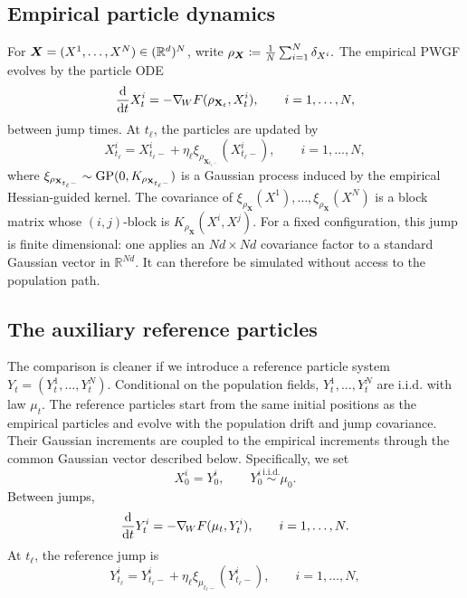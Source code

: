 \subsection{Empirical particle dynamics}
\label{subsec:particle-pwgf}

For \(\boldsymbol{X}=(X^1,\ldots,X^N)\in(\mathbb{R}^d)^N\), write $\rho_{\boldsymbol{X}}\coloneq \frac1N\sum_{i=1}^N \delta_{X^i}.$
The empirical PWGF evolves by the particle ODE
\begin{equation}
    \frac{\dd}{\dd t}X^i_t
    =
    -\nabla_{\!W} F(\rho_{\mathbf X_t},X^i_t),
    \qquad i=1,\ldots,N,
    \label{eq:particle-flow}
\end{equation}
between jump times.  At \(t_\ell\), the particles are updated by
\begin{equation}
    X^i_{t_\ell}
    =
    X^i_{t_\ell-}+\eta_\ell\xi_{\rho_{\mathbf X_{t_\ell-}}}(X^i_{t_\ell-}),
    \qquad i=1,\ldots,N,
    \label{eq:particle-jump}
\end{equation}
where \(\xi_{\rho_{\mathbf X_{t_\ell-}}} \sim \mathrm{GP}(0,K_{\rho_{\mathbf X_{t_\ell-}}})\) is a Gaussian process induced by the empirical Hessian-guided kernel.  The covariance of \(\xi_{\rho_{\mathbf X}}(X^1),\ldots,\xi_{\rho_{\mathbf X}}(X^N)\) is
a block matrix whose \((i,j)\)-block is \(K_{\rho_{\mathbf X}}(X^i,X^j)\).
For a fixed configuration, this jump is finite dimensional: one applies an
\(Nd\times Nd\) covariance factor to a standard Gaussian vector in
\(\mathbb R^{Nd}\). It can therefore be simulated without access to the
population path.

\subsection{The auxiliary reference particles}
\label{subsec:auxiliary-particles}

The comparison is cleaner if we introduce a reference particle system
\(Y_t=(Y^1_t,\ldots,Y^N_t)\). Conditional on the population fields,
\(Y_t^1,\ldots,Y_t^N\) are i.i.d. with law \(\mu_t\). The reference particles
start from the same initial positions as the empirical particles and evolve
with the population drift and jump covariance. Their Gaussian increments are
coupled to the empirical increments through the common Gaussian vector
described below.
Specifically, we set
\begin{equation}
    X^i_0=Y^i_0,
    \qquad
    Y^i_0\stackrel{\mathrm{i.i.d.}}\sim \mu_0.
    \label{eq:same-initial-particles}
\end{equation}
Between jumps,
\begin{equation}
    \frac{\dd}{\dd t}Y^i_t
    =
    -\nabla_{\!W} F(\mu_t,Y^i_t),
    \qquad i=1,\ldots,N.
    \label{eq:reference-flow}
\end{equation}
At \(t_\ell\), the reference jump is
\begin{equation}
    Y^i_{t_\ell}
    =
    Y^i_{t_\ell-}+\eta_\ell\xi_{\mu_{t_\ell-}}(Y^i_{t_\ell-}),
    \qquad i=1,\ldots,N,
    \label{eq:reference-jump}
\end{equation}

